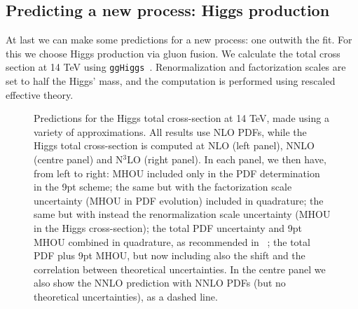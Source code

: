 \subsection{Predicting a new process: Higgs production}
At last we can make some predictions for a new process: one outwith the fit. For this we choose Higgs production via gluon fusion. We calculate the total cross section at 14 TeV using {\tt  ggHiggs}~\cite{Ball:2013bra,Bonvini:2014jma,Bonvini:2016frm}.
Renormalization and factorization scales are set to half the Higgs' mass, and the computation is performed using rescaled effective theory.

\begin{figure}[h]
    \begin{center}
    \end{center}
  \vspace{-0.55cm}
  \caption{Predictions for the Higgs total cross-section at 14 TeV, made using a variety of approximations. All results use NLO PDFs, while the Higgs total cross-section is computed at NLO (left panel), NNLO (centre panel) and N$^3$LO (right panel). In each panel, we then have, from left to right: MHOU included only in the PDF determination in the 9pt scheme; the same but with the factorization scale uncertainty (MHOU in PDF evolution) included in quadrature; the same but with instead the renormalization scale uncertainty (MHOU in the Higgs cross-section); the total PDF uncertainty and 9pt MHOU combined in quadrature, as recommended in ~\cite{AbdulKhalek:2019ihb}; the total PDF plus 9pt MHOU, but now including also the shift and the correlation between theoretical uncertainties. In the centre panel we also show the NNLO prediction with NNLO PDFs (but no theoretical uncertainties), as a dashed line. }
  \label{fig:Higgs}
\end{figure}

